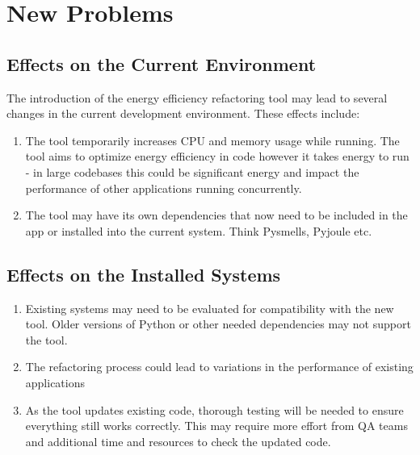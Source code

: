 \documentclass[12pt]{article}
\begin{document}
\section{New Problems}
\subsection{Effects on the Current Environment}
The introduction of the energy efficiency refactoring tool may lead to several changes in the current development environment. These effects include:
\begin{enumerate}
  \item The tool temporarily increases CPU and memory usage while running. The tool aims to optimize energy efficiency in code however it takes energy to run - in large codebases this could be significant energy and impact the performance of other applications running concurrently. 
  \item The tool may have its own dependencies that now need to be included in the app or installed into the current system. Think Pysmells, Pyjoule etc.
\end{enumerate}

\subsection{Effects on the Installed Systems}
\begin{enumerate}
  \item Existing systems may need to be evaluated for compatibility with the new tool. Older versions of Python or other needed dependencies may not support the tool.
  \item The refactoring process could lead to variations in the performance of existing applications
  \item As the tool updates existing code, thorough testing will be needed to ensure everything still works correctly. This may require more effort from QA teams and additional time and resources to check the updated code.
\end{enumerate}
\end{document}
